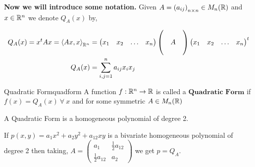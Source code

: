 \documentclass[../Analysis-3.tex]{subfiles}
\begin{document}
\textbf{Now we will introduce some notation.} Given $A = \left( a_{ij} \right)_{n\times n} \in M_n(\mathbb{R})$ and $ x \in \mathbb{R}^n $ we denote $ Q_A(x) $  by,

\begin{align*}
  Q_A(x) = x^tAx = {\left\langle Ax,x \right\rangle}_{\mathbb{R}^n} & = \begin{pmatrix}
                                                                  x_1 & x_2 & \ldots & x_n
                                                                \end{pmatrix} \begin{pmatrix}
                                                                                 &   & \\
                                                                                 & A & \\
                                                                                 &   &
                                                                              \end{pmatrix} \begin{pmatrix}
                                                                                              x_1 & x_2 & \ldots & x_n
                                                                                            \end{pmatrix} ^t \\
  Q_A(x)                                                    & = \sum_{i,j = 1}^{n} a_{ij} x_i x_j
\end{align*}



\begin{Def}{Quadratic Form}{quadform}
  A function $f : \mathbb{R}^n \to \mathbb{R}$ is called a $\textbf{Quadratic Form}$ if $f(x) = Q_A(x) \ \forall\ x $ and for some symmetric $A \in M_n(\mathbb{R})$
\end{Def}

A Quadratic Form is a homogeneous polynomial of degree 2.

If $p(x,y) = a_1 x^2 + a_2 y^2 + a_{12} xy$
is a bivariate homogeneous polynomial of degree 2 then taking, $A = \begin{pmatrix}
    a_1                & \frac{1}{2} a_{12} \\
    \frac{1}{2} a_{12} & a_2
  \end{pmatrix}$ we get $p = Q_A$.
\end{document}
